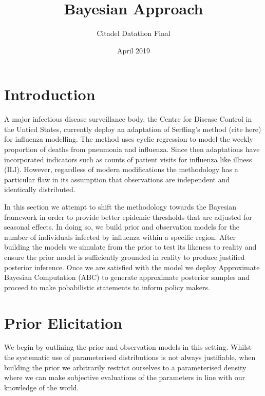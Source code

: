 \documentclass{article}
\title{Bayesian Approach}
\author{Citadel Datathon Final }
\date{April 2019}
\begin{document}
\maketitle

\section{Introduction}

A major infectious disease surveillance body, the Centre for Disease Control in the Untied States, currently deploy an adaptation of Serfling's method (cite here) for influenza modelling. The method uses cyclic regression to model the weekly proportion of deaths from pneumonia and influenza. Since then adaptations have incorporated indicators such as counts of patient visits for influenza like illness (ILI). However, regardless of modern modifications the methodology has a particular flaw in its assumption that observations are independent and identically distributed.

In this section we attempt to shift the methodology towards the Bayesian framework in order to provide better epidemic thresholds that are adjusted for seasonal effects. In doing so, we build prior and observation models for the number of individuals infected by influenza within a specific region. After building the models we simulate from the prior to test its likeness to reality and ensure the prior model is sufficiently grounded in reality to produce justified posterior inference. Once we are satisfied with the model we deploy Approximate Bayesian Computation (ABC) to generate approximate posterior samples and proceed to make pobabilistic statements to inform policy makers. 

\section{Prior Elicitation}
We begin by outlining the prior and observation models in this setting. Whilst the systematic use of parameterised distributions is not always justifiable, when building the prior we arbitrarily restrict ourselves to a parameterised density where we can make subjective evaluations of the parameters in line with our knowledge of the world.
\end{document}
